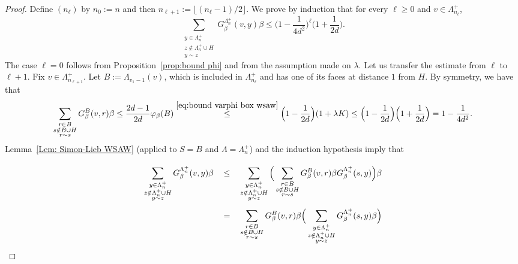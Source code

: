\documentclass[11pt,a4paper]{article}
\numberwithin{equation}{section}
\theoremstyle{plain}
\theoremstyle{definition}
\begin{document}
\begin{proof}
Define $(n_\ell)$ by $n_0:=n$ and then $n_{\ell+1}:=\lfloor (n_\ell-1)/2\rfloor$. We prove by induction that for every $\ell\ge0$ and $v\in \Lambda_{n_\ell}^+$,
\begin{equation}\label{eq: induction}
\sum_{\substack{y \in \Lambda_n^+\\ z\notin \Lambda_n^+\cup H\\ y\sim z}}G_\beta^{\Lambda_n^+}(v,y)\beta \le \Big(1-\frac1{4d^2}\Big)^{\ell}\Big(1+\frac{1}{2d}\Big).
\end{equation}
The case $\ell=0$ follows from Proposition~\ref{prop:bound phi} and from the assumption made on $\lambda$.  Let us transfer the estimate from $\ell$ to $\ell+1$. Fix $v\in \Lambda_{n_{\ell+1}}^+$. Let $B:=\Lambda_{v_1-1}(v)$, which is included in $\Lambda_{n_\ell}^+$ and has one of its faces at distance $1$ from $H$. By symmetry, we have that 
\begin{equation}\label{eq:j1}
\sum_{\substack{r \in B\\ s\notin B\cup H\\ r\sim s}}G_\beta^{B}(v,r)\beta \le \frac{2d-1}{2d}\varphi_\beta(B)\stackrel{\eqref{eq:bound varphi box wsaw}}\le \Big(1-\frac1{2d}\Big)(1+\lambda K)\leq\Big(1-\frac1{2d}\Big)\Big(1+\frac{1}{2d}\Big) =1-\frac{1}{4d^2}.
\end{equation}
Lemma~\ref{Lem: Simon-Lieb WSAW} (applied to $S=B$ and $\Lambda=\Lambda_n^+$) and the induction hypothesis imply that 
\begin{align}
\sum_{\substack{y \in \Lambda_n^+\\ z\notin \Lambda_n^+\cup H\\ y\sim z}}G_\beta^{\Lambda_n^+}(v,y)\beta&\stackrel{\phantom{\eqref{eq:j1}}}\le \sum_{\substack{y \in \Lambda_n^+\\ z\notin \Lambda_n^+\cup H\\ y\sim z}}\Big(\sum_{\substack{r \in B\\ s\notin B\cup H\\ r\sim s}}G_\beta^{B}(v,r)\beta G_\beta^{\Lambda_n^+}(s,y)\Big)\beta \\
&\stackrel{\phantom{\eqref{eq:j1}}}=\sum_{\substack{r \in B\\ s\notin B\cup H\\ r\sim s}}G_\beta^{B}(v,r)\beta\Big(\sum_{\substack{y \in \Lambda_n^+\\ z\notin \Lambda_n^+\cup H\\ y\sim z}}G_\beta^{\Lambda_n^+}(s,y)\beta\Big) \\

\end{align}
\end{proof}
\end{document}
